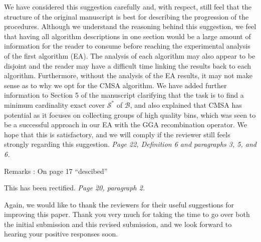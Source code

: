 \documentclass[a4paper,11pt]{article}
\newcommand{\note}[1]{{\color{myDarkBlue2}#1}}
\newcommand{\resp}[1]{{\color{myDarkBlue2}#1}} %
\begin{document}
\resp{We have considered this suggestion carefully and, with respect, still feel that the structure of the original manuscript is best for describing the progression of the procedures. Although we understand the reasoning behind this suggestion, we feel that having all algorithm descriptions in one section would be a large amount of information for the reader to consume before reaching the experimental analysis of the first algorithm (EA). The analysis of each algorithm may also appear to be disjoint and the reader may have a difficult time linking the results back to each algorithm. Furthermore, without the analysis of the EA results, it may not make sense as to why we opt for the CMSA algorithm. We have added further information to Section 5 of the manuscript clarifying that the task is to find a minimum cardinality exact cover $\mathcal{S}^*$ of $\mathcal{B}$, and also explained that CMSA has potential as it focuses on collecting groups of high quality bins, which was seen to be a successful approach in our EA with the GGA recombination operator. We hope that this is satisfactory, and we will comply if the reviewer still feels strongly regarding this suggestion. \textit{Page 22, Definition 6 and paragraphs 3, 5, and 6.}}


Remarks : 
On page 17 ``descibed''

\resp{This has been rectified. \textit{Page 20, paragraph 2.}}\vspace{8mm}




\note{Again, we would like to thank the reviewers for their useful suggestions for improving this paper. Thank you very much for taking the time to go over both the initial submission and this revised submission, and we look forward to hearing your positive responses soon.}
\end{document}
